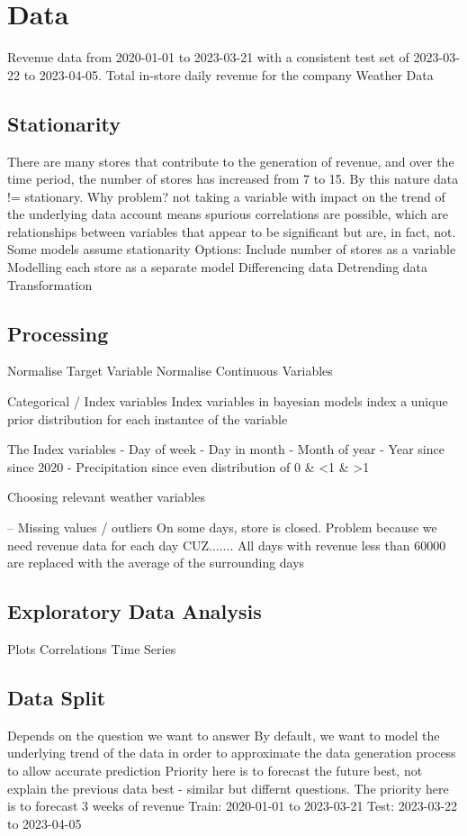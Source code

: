 
\section{Data}
Revenue data from 2020-01-01 to 2023-03-21 with a consistent test set of
2023-03-22 to 2023-04-05.
Total in-store daily revenue for the company
Weather Data 

\subsection{Stationarity}
There are many stores that contribute to the generation of revenue, and over
the time period, the number of stores has increased from 7 to 15. By this
nature data != stationary. 
Why problem? 
not taking a variable with impact on the trend of the underlying data account
means spurious correlations are possible, which are relationships between
variables that appear to be significant but are, in fact, not. 
Some models assume stationarity
Options:
Include number of stores as a variable
Modelling each store as a separate model
Differencing data
Detrending data
Transformation

\subsection{Processing}
Normalise Target Variable
Normalise Continuous Variables

Categorical / Index variables
Index variables in bayesian models index a unique prior distribution for each
instantce of the variable

The Index variables
- Day of week
- Day in month
- Month of year
- Year since since 2020
- Precipitation since even distribution of 0 \& <1 \& >1

Choosing relevant weather variables

-- Missing values / outliers
On some days, store is closed. 
Problem because we need revenue data for each day CUZ.......
All days with revenue less than 60000 are replaced with the average of the surrounding days


\subsection{Exploratory Data Analysis}
Plots
Correlations
Time Series

\subsection{Data Split}
Depends on the question we want to answer
By default, we want to model the underlying trend of the data in order to approximate the data generation process to allow accurate prediction
Priority here is to forecast the future best, not explain the previous data best - similar but differnt questions.
The priority here is to forecast 3 weeks of revenue
Train: 2020-01-01 to 2023-03-21
Test: 2023-03-22 to 2023-04-05

